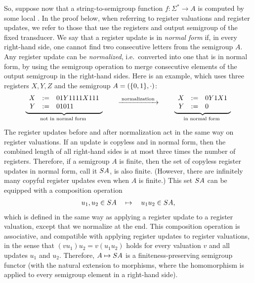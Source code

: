 So, suppose now that a string-to-semigroup function $f\colon \Sigma^* \to A$ is
computed by some local \sst. In the proof below, when referring to register valuations and register updates, we refer to those that use the registers and output semigroup of the fixed transducer. We say that a register update is in \emph{normal form} if, in every right-hand side, one cannot find two consecutive letters from the semigroup $A$.
Any register update can be \emph{normalized}, i.e.~converted into one that is in normal form, by using the semigroup operation to merge consecutive elements of the output semigroup in the right-hand sides.
Here is an example, which uses three registers $X,Y,Z$ and the semigroup $A = (\{0,1\}, \cdot)$:
\begin{align*}
  \myunderbrace{
  \begin{array}{rcl}
    X &:=& 01Y1111X111\\
    Y &:=& 01011
  \end{array}
  }{not in normal form}
  \qquad \xrightarrow{\;\text{normalization}\;} \qquad
  \myunderbrace{
  \begin{array}{rcl}
    X &:=& 0Y1X1\\
    Y &:=& 0
  \end{array}
  }{in normal form}
\end{align*}
The register updates before and after normalization act in the same way on
register valuations. If an update is copyless and in normal form, then the
combined length of all right-hand sides is at most three times the number of
registers. Therefore, if a semigroup $A$ is finite, then the set of copyless
register updates in normal form, call it $\functors A$, is also finite.
(However, there are infinitely many copyful register updates even when $A$ is
finite.) This set $\functors A$ can be equipped with a composition operation
\begin{align*}
    u_1,u_2 \in \functors A  \quad \mapsto \quad u_1u_2 \in \functors A,
\end{align*}
which is defined in the same way as applying a register update to a register
valuation, except that we normalize at the end. This composition operation is
associative, and  compatible with applying register updates to register
valuations, in the sense that $(vu_1)u_2 = v(u_1u_2)$ holds for every valuation
$v$ and all updates $u_1$ and $u_2$. Therefore, $A \mapsto \functors A$ is a finiteness-preserving semigroup functor (with the natural extension to morphisms, where the homomorphism is applied to every semigroup element in a right-hand side). 

